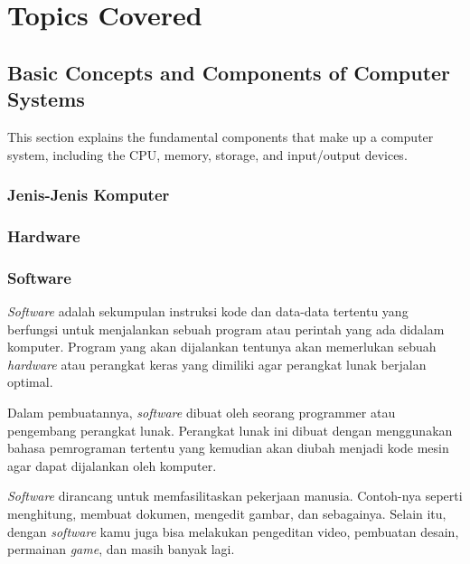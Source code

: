 \documentclass[12pt]{article}
\begin{document}
\section{Topics Covered}

\subsection{Basic Concepts and Components of Computer Systems}
This section explains the fundamental components that make up a computer system, including the CPU, memory, storage, and input/output devices.
\subsubsection{Jenis-Jenis Komputer}
\subsubsection{Hardware}
\subsubsection{Software}
    \par
    \hspace{0.61cm}\textit{Software} adalah sekumpulan instruksi kode dan data-data tertentu yang berfungsi untuk menjalankan sebuah program atau perintah yang ada didalam komputer. Program yang akan dijalankan tentunya akan memerlukan sebuah \textit{hardware} atau perangkat keras yang dimiliki agar perangkat lunak berjalan optimal.\cite{IDCloudHost}

    Dalam pembuatannya, \textit{software} dibuat oleh seorang programmer atau pengembang perangkat lunak. Perangkat lunak ini dibuat dengan menggunakan bahasa pemrograman tertentu yang kemudian akan diubah menjadi kode mesin agar dapat dijalankan oleh komputer.\cite{JagoanHosting}

    \textit{Software} dirancang untuk memfasilitaskan pekerjaan manusia. Contoh-nya seperti menghitung, membuat dokumen, mengedit gambar, dan sebagainya. Selain itu, dengan \textit{software} kamu juga bisa melakukan pengeditan video, pembuatan desain, permainan \textit{game}, dan masih banyak lagi.\cite{JagoanHosting}
\end{document}
